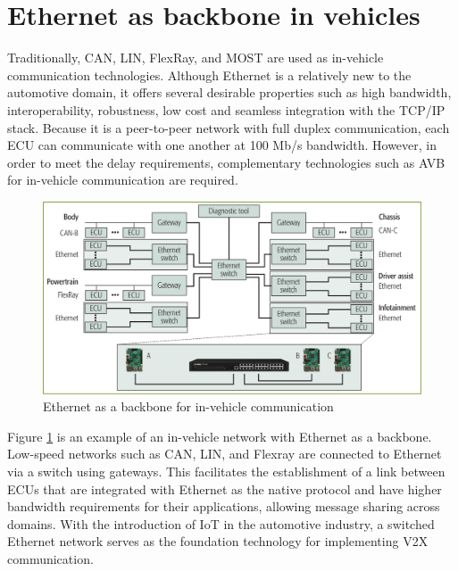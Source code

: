 \section{Ethernet as backbone in vehicles}
Traditionally, CAN, LIN, FlexRay, and MOST are used as in-vehicle communication technologies\cite{b1.0_EthBackbone}. Although Ethernet is a relatively new to the automotive domain, it offers several desirable properties such as high bandwidth, interoperability, robustness, low cost and seamless integration with the TCP/IP stack\cite{b1.0_EthBackbone}. Because it is a peer-to-peer network with full duplex communication, each ECU can communicate with one another at 100 Mb/s bandwidth. However, in order to meet the delay requirements, complementary technologies such as AVB for in-vehicle communication are required.   

\begin{figure}[!htb]
	\centering
		\includegraphics[width=1\textwidth]{images/Switched_Ethernet_backbone.png}
	\caption{Ethernet as a backbone for in-vehicle communication\cite{b1.0_EthBackbone}}
	\label{fig:Switched_Ethernet_backbone}
\end{figure}

\par Figure \ref{fig:Switched_Ethernet_backbone} is an example of an in-vehicle network with Ethernet as a backbone. Low-speed networks such as CAN, LIN, and Flexray are connected to Ethernet via a switch using gateways\cite{b1.0_EthBackbone}. This facilitates the establishment of a link between ECUs that are integrated with Ethernet as the native protocol and have higher bandwidth requirements for their applications, allowing message sharing across domains. With the introduction of IoT in the automotive industry, a switched Ethernet network serves as the foundation technology for implementing V2X communication.


